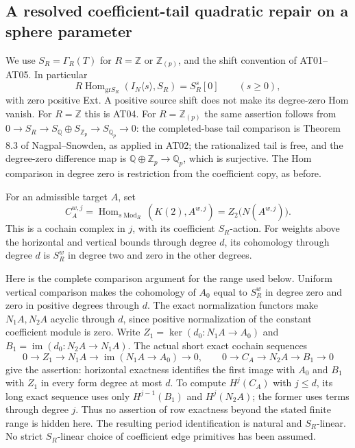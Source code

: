 \subsection{A resolved coefficient-tail quadratic repair on a sphere parameter}

We use $S_R=\Gamma_R(T)$ for $R=\mathbb Z$ or
$\mathbb Z_{(p)}$, and the shift convention of AT01--AT05.
In particular
\[
 R\operatorname{Hom}_{\mathrm{gr}S_R}
       (I_N\langle s\rangle,S_R)=S_R^s[0]\qquad(s\geq0),
 \tag{AT.71}
\]
with zero positive Ext. A positive source shift does
not make its degree-zero Hom vanish.
For $R=\mathbb Z$ this is AT04.
For $R=\mathbb Z_{(p)}$ the same assertion follows from
$0\to S_R\to S_{\mathbb Q}\oplus S_{\mathbb Z_p}
\to S_{\mathbb Q_p}\to0$:
the completed-base tail comparison is Theorem 8.3 of
Nagpal--Snowden, as applied in AT02;
the rationalized tail is free, and the degree-zero
difference map is $\mathbb Q\oplus\mathbb Z_p\to\mathbb Q_p$,
which is surjective. The Hom comparison in degree zero
is restriction from the coefficient copy, as before.

For an admissible target $A$, set
\[
 C_A^{w,j}
   =\operatorname{Hom}_{s\operatorname{Mod}_R}
           (K(2),A^{w,j})
   =Z_2\bigl(N(A^{w,j})\bigr).
 \tag{AT.72}
\]
This is a cochain complex in $j$, with its coefficient
$S_R$-action. For weights above the horizontal and
vertical bounds through degree $d$, its cohomology
through degree $d$ is $S_R^w$ in degree two and zero
in the other degrees.

Here is the complete comparison argument for the range
used below. Uniform vertical comparison makes the
cohomology of $A_0$ equal to $S_R^w$ in degree zero
and zero in positive degrees through $d$.
The exact normalization functors make $N_1A,N_2A$
acyclic through $d$, since positive normalization of
the constant coefficient module is zero.
Write $Z_1=\ker(d_0:N_1A\to A_0)$ and
$B_1=\operatorname{im}(d_0:N_2A\to N_1A)$.
The actual short exact cochain sequences
\[
 0\to Z_1\to N_1A\to\operatorname{im}(N_1A\to A_0)\to0,
 \qquad
 0\to C_A\to N_2A\to B_1\to0
 \tag{AT.73}
\]
give the assertion: horizontal exactness identifies
the first image with $A_0$ and $B_1$ with $Z_1$
in every form degree at most $d$.
To compute $H^j(C_A)$ with $j\leq d$, its long exact
sequence uses only $H^{j-1}(B_1)$ and $H^j(N_2A)$;
the former uses terms through degree $j$.
Thus no assertion of row exactness beyond the stated
finite range is hidden here.
The resulting period identification is natural and
$S_R$-linear. No strict $S_R$-linear choice of coefficient
edge primitives has been assumed.


